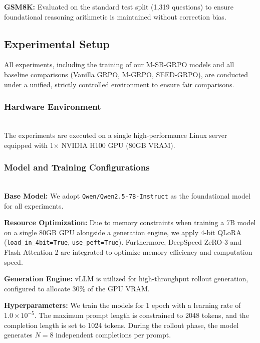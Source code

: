 \textbf{GSM8K:} Evaluated on the standard test split (1,319 questions) to ensure foundational reasoning arithmetic is maintained without correction bias.

\subsection{Experimental Setup}
All experiments, including the training of our M-SB-GRPO models and all baseline comparisons (Vanilla GRPO, M-GRPO, SEED-GRPO), are conducted under a unified, strictly controlled environment to ensure fair comparisons.

\subsubsection{Hardware Environment} \mbox{} \\
The experiments are executed on a single high-performance Linux server equipped with 1$\times$ NVIDIA H100 GPU (80GB VRAM). 

\subsubsection{Model and Training Configurations} \mbox{} \\
\textbf{Base Model:} We adopt \texttt{Qwen/Qwen2.5-7B-Instruct} as the foundational model for all experiments.

\textbf{Resource Optimization:} Due to memory constraints when training a 7B model on a single 80GB GPU alongside a generation engine, we apply 4-bit QLoRA (\texttt{load\_in\_4bit=True}, \texttt{use\_peft=True}). Furthermore, DeepSpeed ZeRO-3 and Flash Attention 2 are integrated to optimize memory efficiency and computation speed.

\textbf{Generation Engine:} vLLM is utilized for high-throughput rollout generation, configured to allocate 30\% of the GPU VRAM.

\textbf{Hyperparameters:} We train the models for 1 epoch with a learning rate of $1.0 \times 10^{-5}$. The maximum prompt length is constrained to 2048 tokens, and the completion length is set to 1024 tokens. During the rollout phase, the model generates $N=8$ independent completions per prompt.